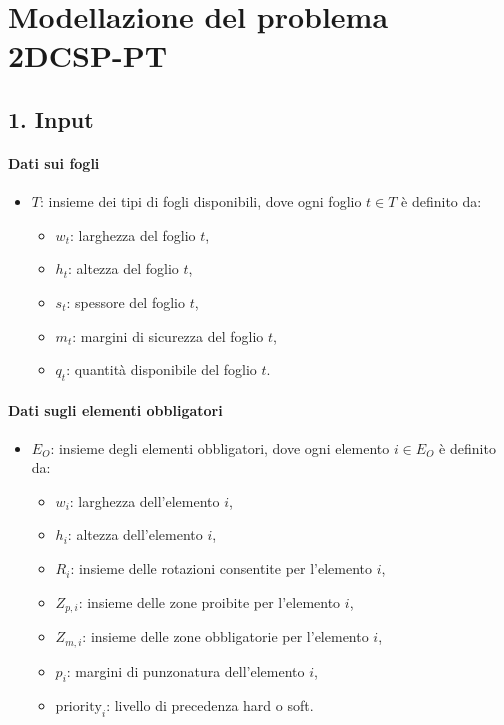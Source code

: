 \section{Modellazione del problema 2DCSP-PT}

\subsection*{1. Input}

\paragraph{Dati sui fogli}  
\begin{itemize}
    \item \( T \): insieme dei tipi di fogli disponibili, dove ogni foglio \( t \in T \) è definito da:
    \begin{itemize}
        \item \( w_t \): larghezza del foglio \( t \),
        \item \( h_t \): altezza del foglio \( t \),
        \item \( s_t \): spessore del foglio \( t \),
        \item \( m_t \): margini di sicurezza del foglio \( t \),
        \item \( q_t \): quantità disponibile del foglio \( t \).
    \end{itemize}
\end{itemize}

\paragraph{Dati sugli elementi obbligatori}  
\begin{itemize}
    \item \( E_O \): insieme degli elementi obbligatori, dove ogni elemento \( i \in E_O \) è definito da:
    \begin{itemize}
        \item \( w_i \): larghezza dell’elemento \( i \),
        \item \( h_i \): altezza dell’elemento \( i \),
        \item \( R_i \): insieme delle rotazioni consentite per l’elemento \( i \),
        \item \( Z_{p,i} \): insieme delle zone proibite per l’elemento \( i \),
        \item \( Z_{m,i} \): insieme delle zone obbligatorie per l’elemento \( i \),
        \item \( p_i \): margini di punzonatura dell’elemento \( i \),
        \item \( \text{priority}_i \): livello di precedenza hard o soft.
    \end{itemize}
\end{itemize}

